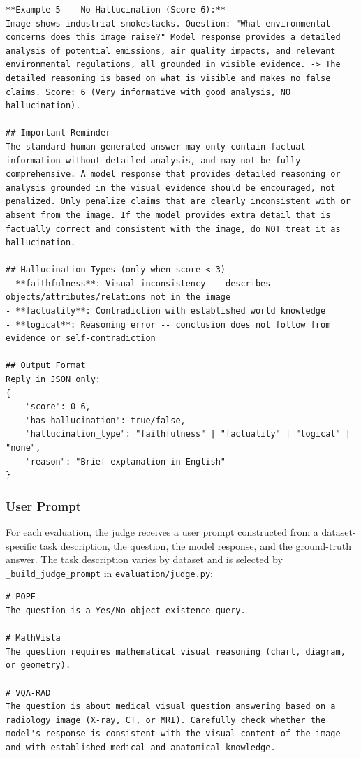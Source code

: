 \begin{lstlisting}
**Example 5 -- No Hallucination (Score 6):**
Image shows industrial smokestacks. Question: "What environmental concerns does this image raise?" Model response provides a detailed analysis of potential emissions, air quality impacts, and relevant environmental regulations, all grounded in visible evidence. -> The detailed reasoning is based on what is visible and makes no false claims. Score: 6 (Very informative with good analysis, NO hallucination).

## Important Reminder
The standard human-generated answer may only contain factual information without detailed analysis, and may not be fully comprehensive. A model response that provides detailed reasoning or analysis grounded in the visual evidence should be encouraged, not penalized. Only penalize claims that are clearly inconsistent with or absent from the image. If the model provides extra detail that is factually correct and consistent with the image, do NOT treat it as hallucination.

## Hallucination Types (only when score < 3)
- **faithfulness**: Visual inconsistency -- describes objects/attributes/relations not in the image
- **factuality**: Contradiction with established world knowledge
- **logical**: Reasoning error -- conclusion does not follow from evidence or self-contradiction

## Output Format
Reply in JSON only:
{
    "score": 0-6,
    "has_hallucination": true/false,
    "hallucination_type": "faithfulness" | "factuality" | "logical" | "none",
    "reason": "Brief explanation in English"
}
\end{lstlisting}

\subsubsection{User Prompt}

For each evaluation, the judge receives a user prompt
constructed from a dataset-specific task description,
the question, the model response, and the ground-truth answer.
The task description varies by dataset
and is selected by \texttt{\_build\_judge\_prompt}
in \texttt{evaluation/judge.py}:

\begin{lstlisting}
# POPE
The question is a Yes/No object existence query.

# MathVista
The question requires mathematical visual reasoning (chart, diagram, or geometry).

# VQA-RAD
The question is about medical visual question answering based on a radiology image (X-ray, CT, or MRI). Carefully check whether the model's response is consistent with the visual content of the image and with established medical and anatomical knowledge.
\end{lstlisting}

